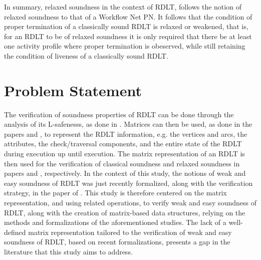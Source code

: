 In summary, relaxed soundness in the context of RDLT, follows the notion of relaxed soundness to that of a Workflow Net PN. It follows that the condition of proper termination of a classically sound RDLT is relaxed or weakened, that is, for an RDLT to be of relaxed soundness it is only required that there be at least one activity profile where proper termination is obeserved, while still retaining the condition of liveness of a classically sound RDLT.



\section{Problem Statement}
\label{sec:ProbStmnt}

The verification of soundness properties of RDLT can be done through the analysis of its L-safenesss, as done in \cite{MalinaoPJS2023}. Matrices can then be used, as done in the papers \cite{KarenRoben2018} and \cite{Asoy2024}, to represent the RDLT information, e.g. the vertices and arcs, the attributes, the check/traversal components, and the entire state of the RDLT during execution up until execution. The matrix representation of an RDLT is then used for the verification of classical soundness and relaxed soundness in papers \cite{Asoy2024} and \cite{KarenRoben2018}, respectively. In the context of this study, the notions of weak and easy soundness of RDLT was just recently formalized, along with the verification strategy, in the paper of \cite{Ramirez2024}. This study is therefore centered on the matrix representation, and using related operations, to verify weak and easy soundness of RDLT, along with the creation of matrix-based data structures, relying on the methods and formalizations of the aforementioned studies. The lack of a well-defined matrix representation tailored to the verification of weak and easy soundness of RDLT, based on recent formalizations, presents a gap in the literature that this study aims to address.

